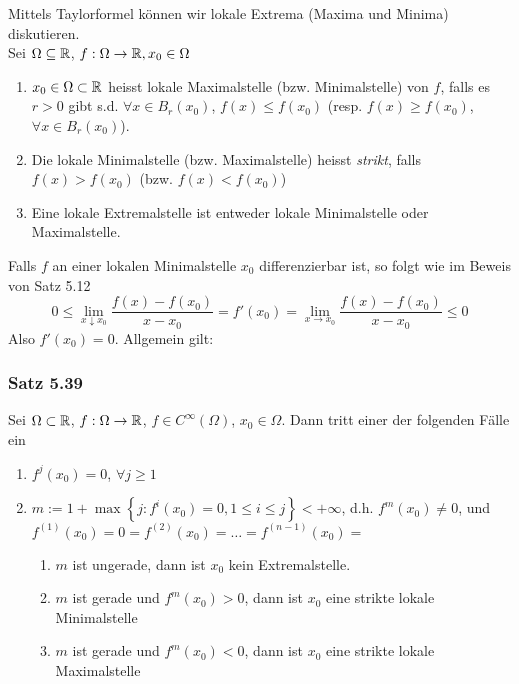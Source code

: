 \noindent Mittels Taylorformel können wir lokale Extrema (Maxima und Minima) diskutieren. \\

\noindent Sei $\Omega\subseteq\mathbb{R}$, $f:\Omega\to\mathbb{R}, x_0\in\Omega$

\begin{definition}{5.38}
\begin{enumerate}
\item $x_0\in\Omega\subset\mathbb{R}$ heisst lokale Maximalstelle (bzw. Minimalstelle) von $f$, falls es $r>0$ gibt s.d. $\forall x\in B_r(x_0)$, $f(x)\leq f(x_0)$ (resp. $f(x)\geq f(x_0)$, $\forall x\in B_r(x_0)$).
\item Die lokale Minimalstelle (bzw. Maximalstelle) heisst \emph{strikt}, falls $f(x)>f(x_0)$ (bzw. $f(x)<f(x_0)$)
\item Eine lokale Extremalstelle ist entweder lokale Minimalstelle oder Maximalstelle.
\end{enumerate}
\end{definition}
Falls $f$ an einer lokalen Minimalstelle $x_0$ differenzierbar ist, so folgt wie im Beweis von Satz 5.12 
\[0\leq \lim\limits_{x\downarrow x_0}\frac{f(x)-f(x_0)}{x-x_0}=f'(x_0)=\lim\limits_{x\to x_0}\frac{f(x)-f(x_0)}{x-x_0}\leq 0\]
Also $f'(x_0)=0$. Allgemein gilt:
\subsubsection*{Satz 5.39}
Sei $\Omega\subset\mathbb{R}$, $f:\Omega\to\mathbb{R}$, $f\in C^{\infty}\left( \Omega\right)$, $x_0\in\Omega$. Dann tritt einer der folgenden Fälle ein
\begin{enumerate}
\item $f^j(x_0)=0$, $\forall j\geq 1$
\item $m:=1+\max\left\{ j:f^i(x_0)=0, 1\leq i\leq j \right\} <+\infty $, d.h. $f^m(x_0)\not=0$, und $f^{(1)}(x_0)=0=f^{(2)}(x_0)=\dots=f^{(n-1)}(x_0)=$
\begin{enumerate}
\item[\hspace{4mm}(2.1)] $m$ ist ungerade, dann ist $x_0$ kein Extremalstelle.
\item[\hspace{4mm}(2.2)] $m$ ist gerade und $f^m(x_0)>0$, dann ist $x_0$ eine strikte lokale Minimalstelle
\item[\hspace{4mm}(2.3)] $m$ ist gerade und $f^m(x_0)<0$, dann ist $x_0$ eine strikte lokale Maximalstelle
\end{enumerate}
\end{enumerate}

